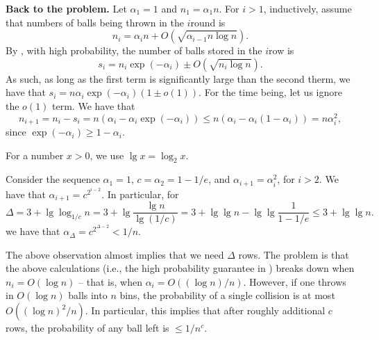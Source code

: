 \medskip%
\noindent%
\textbf{Back to the problem.}  Let $\alpha_1=1$ and $n_1 = \alpha_1n$.
For $i >1$, inductively, assume that numbers of balls being thrown in
the $i$\th round is
\begin{equation*}
    n_i = \alpha_i n + O( \sqrt{ \alpha_{i-1} n \log n} ). 
\end{equation*}
By , with high probability, the number of balls
stored in the $i$\th row is
\begin{equation*}
    s_i = n_i  \exp( -\alpha_i) \pm O(\sqrt{n_i  \log n}).
\end{equation*}
As such, as long as the first term is significantly large than the
second therm, we have that
$s_i = n \alpha_i \exp(-\alpha_i) (1 \pm o(1))$. For the time being,
let us ignore the $o(1)$ term. We have that
\begin{equation*}
    n_{i+1} = n_ i - s_i%
    =%
    n(\alpha_i - \alpha_i \exp(-\alpha_i))%
    \leq 
    n(\alpha_i - \alpha_i(1-\alpha_i))%
    =%
    n \alpha_i^2,
\end{equation*}
since $\exp(-\alpha_i) \geq 1-\alpha_i$.


\begin{defn}
    For a number $x > 0$, we use $\lg x = \log_2 x$.
\end{defn}

\begin{observation}
    Consider the sequence $\alpha_1 =1$, $c = \alpha_2=1-1/e$, and
    $\alpha_{i+1} = \alpha_i^2$, for $i>2$. We have that
    $\alpha_{i+1} = c^{2^{i-2}}$. In particular, for
    \begin{equation*}
        \Delta%
        =%
        3 + \lg \log_{1/c} n
        =%
        3 + \lg \frac{\lg n}{\lg (1/c)}
        =
        3 + \lg \lg n  - \lg\lg \frac{1}{1-1/e}
        \leq 3 + \lg \lg n.
    \end{equation*}
    we have that $\alpha_\Delta = c^{2^{\Delta-2}} < 1/n$.
\end{observation}

The above observation almost implies that we need $\Delta$ rows. The
problem is that the above calculations (i.e., the high probability
guarantee in ) breaks down when $n_i = O(\log n)$
-- that is, when $\alpha_i = O((\log n) / n)$. However, if one throws
in $O( \log n)$ balls into $n$ bins, the probability of a single
collision is at most $O( (\log n)^2/n)$. In particular, this implies
that after roughly additional $c$ rows, the probability of any ball
left is $\leq 1/n^c$.


